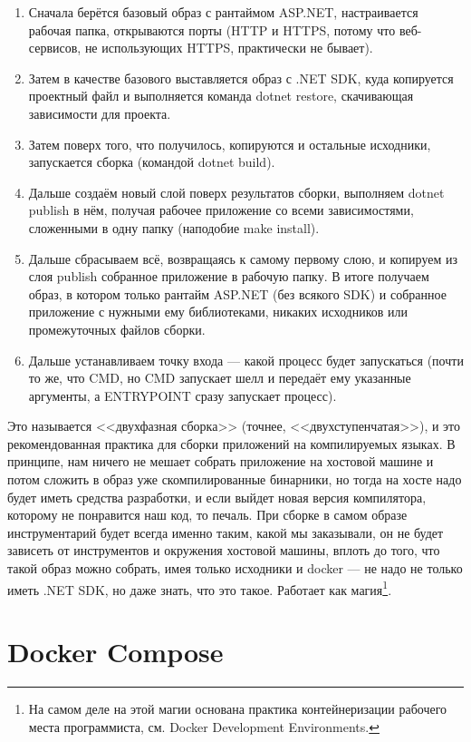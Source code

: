 \documentclass[a5paper]{article}
\begin{document}
\begin{enumerate}
    \item Сначала берётся базовый образ с рантаймом ASP.NET, настраивается рабочая папка, открываются порты (HTTP и HTTPS, потому что веб-сервисов, не использующих HTTPS, практически не бывает).
    \item Затем в качестве базового выставляется образ с .NET SDK, куда копируется проектный файл и выполняется команда dotnet restore, скачивающая зависимости для проекта. 
    \item Затем поверх того, что получилось, копируются и остальные исходники, запускается сборка (командой dotnet build).
    \item Дальше создаём новый слой поверх результатов сборки, выполняем dotnet publish в нём, получая рабочее приложение со всеми зависимостями, сложенными в одну папку (наподобие make install).
    \item Дальше сбрасываем всё, возвращаясь к самому первому слою, и копируем из слоя publish собранное приложение в рабочую папку. В итоге получаем образ, в котором только рантайм ASP.NET (без всякого SDK) и собранное приложение с нужными ему библиотеками, никаких исходников или промежуточных файлов сборки.
    \item Дальше устанавливаем точку входа --- какой процесс будет запускаться (почти то же, что CMD, но CMD запускает шелл и передаёт ему указанные аргументы, а ENTRYPOINT сразу запускает процесс).
\end{enumerate}

Это называется <<двухфазная сборка>> (точнее, <<двухступенчатая>>), и это рекомендованная практика для сборки приложений на компилируемых языках. В принципе, нам ничего не мешает собрать приложение на хостовой машине и потом сложить в образ уже скомпилированные бинарники, но тогда на хосте надо будет иметь средства разработки, и если выйдет новая версия компилятора, которому не понравится наш код, то печаль. При сборке в самом образе инструментарий будет всегда именно таким, какой мы заказывали, он не будет зависеть от инструментов и окружения хостовой машины, вплоть до того, что такой образ можно собрать, имея только исходники и docker --- не надо не только иметь .NET SDK, но даже знать, что это такое. Работает как магия\footnote{На самом деле на этой магии основана практика контейнеризации рабочего места программиста, см. Docker Development Environments.}.

\section{Docker Compose}
\end{document}
